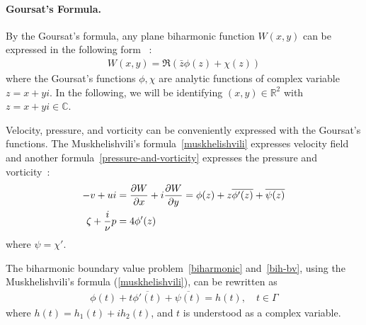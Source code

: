 \documentclass[10pt,twocolumn,letterpaper]{article}
\begin{document}
\paragraph{Goursat's Formula.} 
By the Goursat's formula, any plane biharmonic function $W(x,y)$ can be expressed in the following form
~\cite{muskhelishviliBasicProblemsMathematical1977}:
\begin{align}
  W(x,y) = \Re (\bar z \phi(z) + \chi (z)) \label{Goursat}
\end{align}
where the Goursat's functions $\phi, \chi$ are analytic functions of complex variable $z = x+yi$.
In the following, we will be identifying $(x,y) \in \mathbb{R}^2$ with $z=x + yi \in \mathbb{C}$.

Velocity, pressure, and vorticity can be conveniently expressed with the Goursat's functions. 
The Muskhelishvili's formula~\eqref{muskhelishvili} expresses velocity field 
and another formula~\eqref{pressure-and-vorticity}
expresses the pressure and vorticity~\cite{muskhelishviliBasicProblemsMathematical1977}:
\begin{align}
  -v + u i & 
    = \pdv{W}{x} + i\pdv{W}{y}
    = \phi(z) + z \overline{\phi'(z)} + \overline{\psi(z)}
    \label{muskhelishvili}\\
  \zeta + \frac{i}{\nu}p & 
    = 4\phi'(z) \label{pressure-and-vorticity}
\end{align} where $\psi = \chi'$.

The biharmonic boundary value problem~\eqref{biharmonic} and~\eqref{bih-bv}, using
the Muskhelishvili's formula (\ref{muskhelishvili}), can be rewritten as
\begin{align}
  \phi(t) + t\overline{\phi'(t)} + \overline{\psi(t)} = h(t), 
  \quad t \in \Gamma \label{musk-bvp}
\end{align} where $h(t) =  h_1(t) + i h_2(t)$,  
and $t$ is understood as a complex variable.
\end{document}
